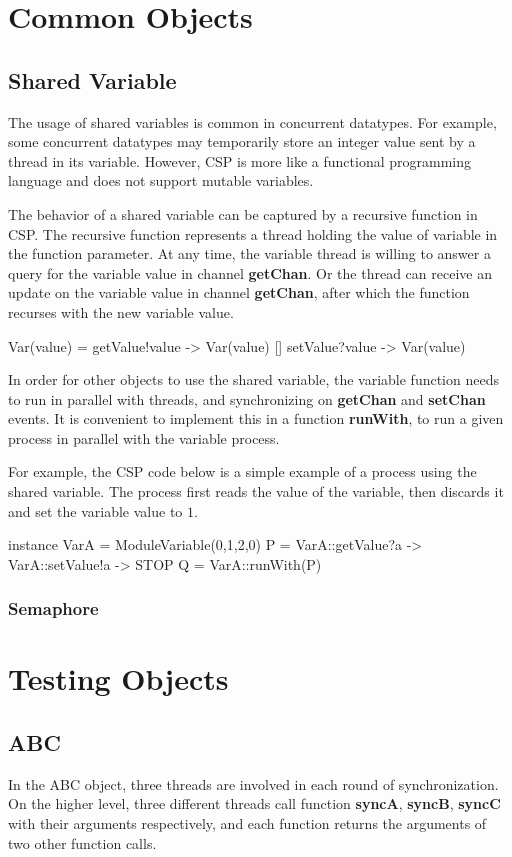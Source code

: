 \documentclass{article}
\begin{document}
\section{Common Objects}
\subsection{Shared Variable}
The usage of shared variables is common in concurrent datatypes. For example, some concurrent datatypes may temporarily store an integer value sent by a thread in its variable. However, CSP is more like a functional programming language and does not support mutable variables. 

The behavior of a shared variable can be captured by a recursive function in CSP. The recursive function represents a thread holding the value of variable in the function parameter. At any time, the variable thread is willing to answer a query for the variable value in channel \textbf{getChan}. Or the thread can receive an update on the variable value in channel \textbf{getChan}, after which the function recurses with the new variable value.

\begin{cspm}
Var(value) = getValue!value -> Var(value)
          [] setValue?value -> Var(value)  
\end{cspm}
In order for other objects to use the shared variable, the variable function needs to run in parallel with threads, and synchronizing on \textbf{getChan} and \textbf{setChan} events. It is convenient to implement this in a function \textbf{runWith}, to run a given process in parallel with the variable process.

For example, the CSP code below is a simple example of a process using the shared variable. The process first reads the value of the variable, then discards it and set the variable value to $1$.
\begin{cspm}
instance VarA = ModuleVariable({0,1,2},0)
P = VarA::getValue?a -> VarA::setValue!a -> STOP
Q = VarA::runWith(P)
\end{cspm}

\subsubsection{Semaphore}


\section{Testing Objects}
\subsection{ABC}
In the ABC object, three threads are involved in each round of synchronization. On the higher level, three different threads call function \textbf{syncA}, \textbf{syncB}, \textbf{syncC} with their arguments respectively, and each function returns the arguments of two other function calls.
\end{document}
